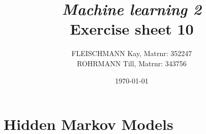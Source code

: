 \documentclass[a4paper, 12pt, titlepage]{article}
\title
{{\em Machine learning 2}\\
Exercise sheet 10}
\author{FLEISCHMANN Kay, Matrnr: 352247\\
	ROHRMANN Till, Matrnr: 343756}
\date{\today}
\begin{document}
\maketitle

\section{Hidden Markov Models} 
\end{document}
